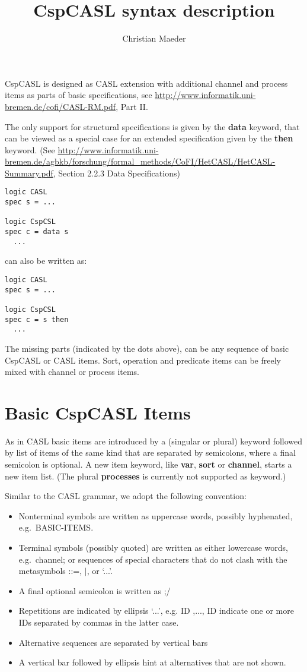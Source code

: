 \documentclass{article}
\title{CspCASL syntax description}
\author{Christian Maeder}
\newcommand{\kw}[1]{{\bf #1}}
\begin{document}
\maketitle

CspCASL is designed as CASL extension with additional channel and process
items as parts of basic specifications, see
\url{http://www.informatik.uni-bremen.de/cofi/CASL-RM.pdf}, Part II.

The only support for structural specifications is given by the \kw{data}
keyword, that can be viewed as a special case for an extended specification
given by the \kw{then} keyword. (See
\url{http://www.informatik.uni-bremen.de/agbkb/forschung/formal_methods/CoFI/HetCASL/HetCASL-Summary.pdf},
Section 2.2.3 Data Specifications)

\begin{verbatim}
logic CASL
spec s = ...

logic CspCSL
spec c = data s
  ...
\end{verbatim}

can also be written as:

\begin{verbatim}
logic CASL
spec s = ...

logic CspCSL
spec c = s then
  ...
\end{verbatim}

The missing parts (indicated by the dots above), can be any sequence of basic
CspCASL or CASL items. Sort, operation and predicate items can be freely mixed
with channel or process items.

\section{Basic CspCASL Items}

As in CASL basic items are introduced by a (singular or plural) keyword
followed by list of items of the same kind that are separated by semicolons,
where a final semicolon is optional. A new item keyword, like \kw{var},
\kw{sort} or \kw{channel}, starts a new item list. (The plural \kw{processes}
is currently not supported as keyword.)

Similar to the CASL grammar, we adopt the following convention:
\begin{itemize}
\item Nonterminal symbols are written as uppercase words, possibly hyphenated,
e.g.~BASIC-ITEMS.
\item Terminal symbols (possibly quoted) are written as either lowercase
  words, e.g.~channel; or sequences of special characters that do not clash
  with the metasymbols ::=, $|$, or ‘...’.
\item A final optional semicolon is written as ;/
\item Repetitions are indicated by ellipsis ‘...’, e.g. ID ,..., ID indicate
  one or more IDs separated by commas in the latter case.
\item Alternative sequences are separated by vertical bars
\item A vertical bar followed by ellipsis hint at alternatives that
  are not shown.
\end{itemize}
\end{document}
